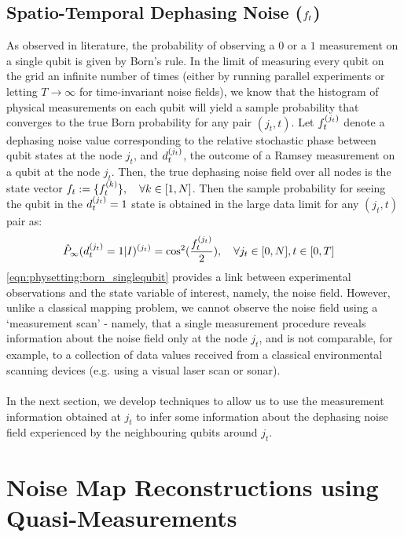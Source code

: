 \subsection{Spatio-Temporal Dephasing Noise ($f_{ t}$)}

As observed in literature, the probability of observing a $0$ or a $1$ measurement on a single qubit is given by Born's rule. In the limit of measuring every qubit on the grid an infinite number of times (either by running parallel experiments or letting $T \to \infty$ for time-invariant noise fields), we know that the histogram of physical measurements on each qubit will yield a sample probability that converges to the true Born probability for any pair $(j_t,t)$. Let $f^{( j_t )}_{t}$ denote a  dephasing noise value corresponding to the relative stochastic phase between qubit states at the node $j_t$, and $d^{( j_t )}_{t}$, the outcome of a Ramsey measurement on a qubit at the node $j_t$. Then, the true dephasing noise field over all nodes is the state vector $ f_{ t}:=\{f^{( k )}_{t} \}, \quad \forall k \in [1,N]$. Then the sample probability for seeing the qubit in the  $d^{( j_t )}_{t}=1$ state is obtained in the large data limit for any $(j_t, t)$ pair as: \\
\begin{align}
\hat{P}_\infty(d^{( j_t )}_{t}=1|I)^{(j_t)} & = \cos^2(\frac{f^{( j_t )}_{t}}{2}), \quad \forall j_t \in [0, N], t \in [0, T] \label{eqn:physetting:born_singlequbit}
\end{align}
\cref{eqn:physetting:born_singlequbit} provides a link between experimental observations and the state variable of interest, namely, the noise field. However, unlike a classical mapping problem, we cannot observe the noise field using a `measurement scan' - namely, that a single measurement procedure reveals information about the noise field only at the node $j_t$, and is not comparable, for example, to a collection of data values received from a classical environmental scanning devices (e.g. using a visual laser scan or sonar). \\
\\
In the next section, we develop techniques to allow us to use the measurement information obtained at $j_t$ to infer some information about the dephasing noise field experienced by the neighbouring qubits around $j_t$.  


\section{Noise Map Reconstructions using Quasi-Measurements }

